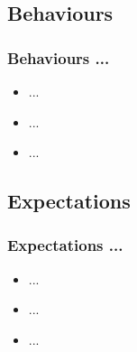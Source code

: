 \documentclass[slidetop,11pt]{beamer}
\begin{document}
\subsection{ Behaviours }
\begin{frame}
	\frametitle{ Behaviours ... }
	\begin{itemize}
		\item ... 
		\item ... 
		\item ... 
	\end{itemize}
\end{frame}

\subsection{ Expectations }
\begin{frame}
	\frametitle{ Expectations ... }
	\begin{itemize}
		\item ... 
		\item ... 
		\item ... 
	\end{itemize}
\end{frame}
\end{document}
